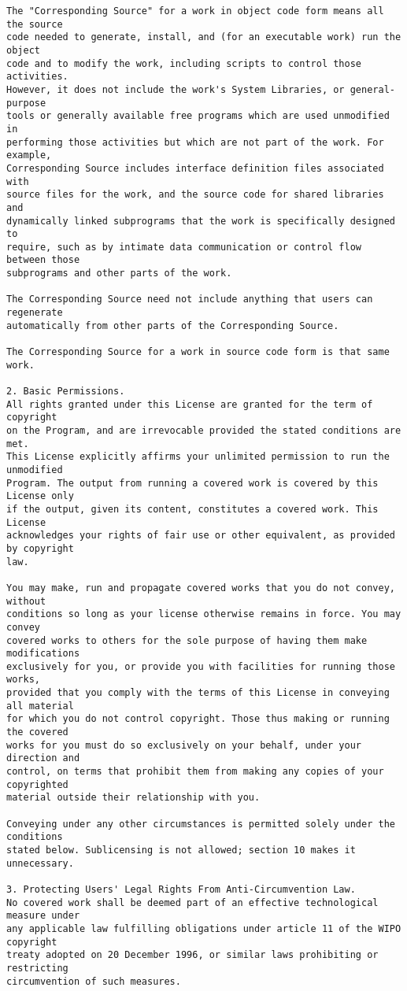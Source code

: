\begin{verbatim}
The "Corresponding Source" for a work in object code form means all the source
code needed to generate, install, and (for an executable work) run the object
code and to modify the work, including scripts to control those activities.
However, it does not include the work's System Libraries, or general-purpose
tools or generally available free programs which are used unmodified in
performing those activities but which are not part of the work. For example,
Corresponding Source includes interface definition files associated with
source files for the work, and the source code for shared libraries and
dynamically linked subprograms that the work is specifically designed to
require, such as by intimate data communication or control flow between those
subprograms and other parts of the work.

The Corresponding Source need not include anything that users can regenerate
automatically from other parts of the Corresponding Source.

The Corresponding Source for a work in source code form is that same work.

2. Basic Permissions.
All rights granted under this License are granted for the term of copyright
on the Program, and are irrevocable provided the stated conditions are met.
This License explicitly affirms your unlimited permission to run the unmodified
Program. The output from running a covered work is covered by this License only
if the output, given its content, constitutes a covered work. This License
acknowledges your rights of fair use or other equivalent, as provided by copyright
law.

You may make, run and propagate covered works that you do not convey, without
conditions so long as your license otherwise remains in force. You may convey
covered works to others for the sole purpose of having them make modifications
exclusively for you, or provide you with facilities for running those works,
provided that you comply with the terms of this License in conveying all material
for which you do not control copyright. Those thus making or running the covered
works for you must do so exclusively on your behalf, under your direction and
control, on terms that prohibit them from making any copies of your copyrighted
material outside their relationship with you.

Conveying under any other circumstances is permitted solely under the conditions
stated below. Sublicensing is not allowed; section 10 makes it unnecessary.

3. Protecting Users' Legal Rights From Anti-Circumvention Law.
No covered work shall be deemed part of an effective technological measure under
any applicable law fulfilling obligations under article 11 of the WIPO copyright
treaty adopted on 20 December 1996, or similar laws prohibiting or restricting
circumvention of such measures.


\end{verbatim}
